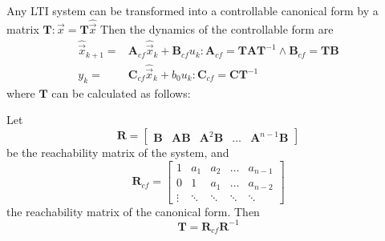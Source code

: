 \documentclass[runningheads,a4paper]{llncs}
\newcommand{\mat}[1]{\boldsymbol{#1}}
\begin{document}
Any LTI system can be transformed into a controllable canonical form by a matrix $\mat{T} : \vec{x}=\mat{T}\hat{\vec{x}}$
Then the dynamics of the controllable form are
\begin{align}
\hat{\vec{x}}_{k+1}=&\mat{A}_{cf}\hat{\vec{x}}_k+\mat{B}_{cf}u_k : \mat{A}_{cf}=\mat{T}\mat{A}\mat{T}^{-1} \wedge \mat{B}_{cf}=\mat{T}\mat{B}\\
y_k=&\mat{C}_{cf}\hat{\vec{x}}_k + b_0u_k : \mat{C}_{cf}=\mat{C}\mat{T}^{-1}\nonumber
\end{align}
where $\mat{T}$ can be calculated as follows:

Let 
\begin{equation}
\mat{R}=[\begin{array}{ccccc}\mat{B}&\mat{A}\mat{B}&\mat{A}^2\mat{B}&\hdots&\mat{A}^{n-1}\mat{B}\end{array}]
\label{eq:rncf}
\end{equation}
be the reachability matrix of the system, and
\begin{equation}
\mat{R}_{cf}=\left[\begin{array}{ccccc}1&a_1&a_2&\hdots&a_{n-1}\\0&1&a_1&\hdots&a_{n-2}\\ \vdots&\ddots&\ddots&\ddots&\ddots\end{array}\right]
\label{eq:rcf}
\end{equation}
the reachability matrix of the canonical form. Then 
\begin{equation}
\mat{T}=\mat{R}_{cf}\mat{R}^{-1}
\label{eq:to_cf}
\end{equation}
\end{document}
